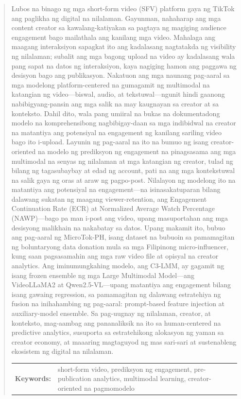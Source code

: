 \begin{abstract}
Lubos na binago ng mga short-form video (SFV) platform gaya ng TikTok ang paglikha ng digital na nilalaman. Gayunman, nahaharap ang mga content creator sa kawalang-katiyakan sa pagtaya ng magiging audience engagement bago mailathala ang kanilang mga video. Mahalaga ang maagang interaksiyon sapagkat ito ang kadalasang nagtatakda ng visibility ng nilalaman; subalit ang mga bagong upload na video ay kadalasang wala pang sapat na datos ng interaksiyon, kaya nagiging hamon ang paggawa ng desisyon bago ang publikasyon. Nakatuon ang mga naunang pag-aaral sa mga modelong platform-centered na gumagamit ng multimodal na katangian ng video—biswal, audio, at tekstuwal—ngunit hindi gaanong nabibigyang-pansin ang mga salik na may kaugnayan sa creator at sa konteksto. Dahil dito, wala pang umiiral na bukas na dokumentadong modelo na komprehensibong nagbibigay-daan sa mga indibidwal na creator na matantiya ang potensiyal na engagement ng kanilang sariling video bago ito i-upload. Layunin ng pag-aaral na ito na bumuo ng isang creator-oriented na modelo ng prediksyon ng engagement na pinagsasama ang mga multimodal na senyas ng nilalaman at mga katangian ng creator, tulad ng bilang ng tagasubaybay at edad ng account, pati na ang mga kontekstuwal na salik gaya ng oras at araw ng pagpo-post. Nilalayon ng modelong ito na matantiya ang potensiyal na engagement—na isinasakatuparan bilang dalawang sukatan ng maagang viewer-retention, ang Engagement Continuation Rate (ECR) at Normalized Average Watch Percentage (NAWP)—bago pa man i-post ang video, upang masuportahan ang mga desisyong malikhain na nakabatay sa datos. Upang makamit ito, bubuo ang pag-aaral ng MicroTok-PH, isang dataset na bubuoin sa pamamagitan ng boluntaryong data donation mula sa mga Filipinong micro-influencer, kung saan pagsasamahin ang mga raw video file at opisyal na creator analytics. Ang iminumungkahing modelo, ang C3-LMM, ay gagamit ng isang frozen ensemble ng mga Large Multimodal Model—ang VideoLLaMA2 at Qwen2.5-VL—upang matantiya ang engagement bilang isang gawaing regression, sa pamamagitan ng dalawang estratehiya ng fusion na inihahambing ng pag-aaral: prompt-based feature injection at auxiliary-model ensemble. Sa pag-uugnay ng nilalaman, creator, at konteksto, mag-aambag ang pananaliksik na ito sa human-centered na predictive analytics, susuporta sa estratehikong alokasyon ng yaman sa creator economy, at maaaring magtaguyod ng mas sari-sari at sustenableng ekosistem ng digital na nilalaman.


\begin{flushleft}
\begin{tabular}{lp{4.25in}}
\hspace{-0.5em}\textbf{Keywords:}\hspace{0.25em} & short-form video, prediksyon ng engagement, pre-publication analytics, multimodal learning, creator-oriented na pagmomodelo
\end{tabular}
\end{flushleft}
\end{abstract}
